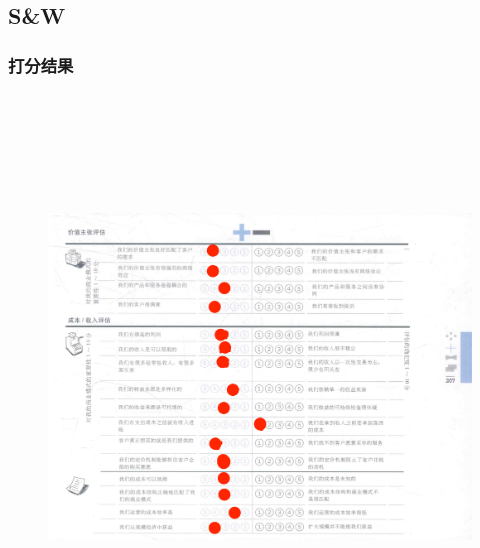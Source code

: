 \documentclass[a4paper,12pt]{article}
\begin{document}
    \subsection{S\&W}
    \subsubsection{打分结果}
    \begin{figure}[htbp]
        \centering
        \includegraphics[width=20cm,height=15cm]{png/S&W1}
    \end{figure}
\end{document}
